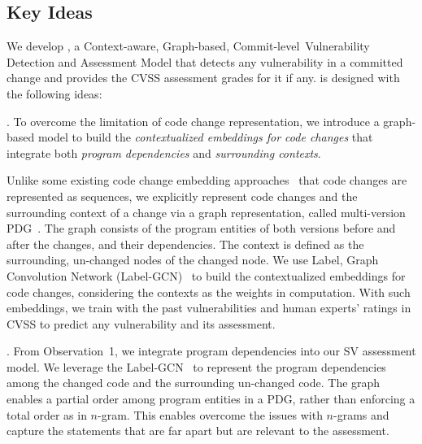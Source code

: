 \vspace{-6pt}
\subsection{Key Ideas}
\label{key-ideas:sec}

We develop {\tool}, a Context-aware, Graph-based,
Commit-level~Vulnerability Detection and Assessment Model that
detects any vulnerability in a committed change and provides
the CVSS assessment grades for it if any.
{\tool} is designed with the following ideas:

\vspace{1pt}
. To overcome
the limitation of code change representation, we introduce a
graph-based model to build the {\em
contextualized embeddings for code changes} that integrate both {\em
program dependencies} and {\em surrounding contexts}.

Unlike some existing code change embedding
approaches~\cite{cc2vec,commit2vec} that code changes are represented
as sequences, we explicitly represent code changes and the surrounding
context of a change via a graph representation, called multi-version
PDG~\cite{flexeme-fse20}. The graph consists of
the program entities of both versions before and after the changes,
and their dependencies. The context is defined as the surrounding,
un-changed nodes of the changed node.
%
We use Label, Graph Convolution Network (Label-GCN)~\cite{label-gcn}
to build the contextualized embeddings for code changes, considering
the contexts as the weights in computation.
%
%
With such embeddings, we train {\tool} with the past vulnerabilities
and human experts' ratings in CVSS to predict any vulnerability and
its assessment.



\vspace{1pt}
.
From Observation~1, we integrate program dependencies into our SV
assessment model. We leverage the Label-GCN~\cite{label-gcn} to
represent the program dependencies among the changed code and the
surrounding un-changed code.
%
The graph enables a partial order among program entities in a PDG,
rather than enforcing a total order as in $n$-gram.
%
This enables {\tool} overcome the issues
with $n$-grams and capture the statements that
are far apart but are relevant to the assessment.

